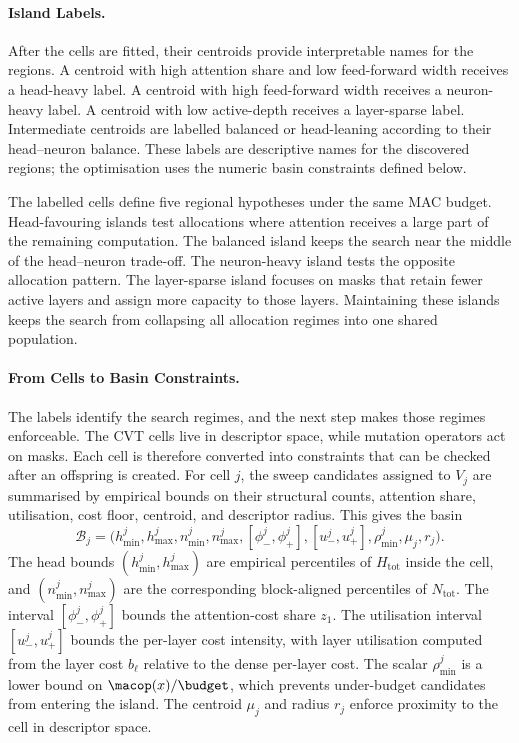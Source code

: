 \paragraph{Island Labels.}
After the cells are fitted, their centroids provide interpretable names for the regions. A centroid with high attention share and low feed-forward width receives a head-heavy label. A centroid with high feed-forward width receives a neuron-heavy label. A centroid with low active-depth receives a layer-sparse label. Intermediate centroids are labelled balanced or head-leaning according to their head--neuron balance. These labels are descriptive names for the discovered regions; the optimisation uses the numeric basin constraints defined below.

The labelled cells define five regional hypotheses under the same MAC budget. Head-favouring islands test allocations where attention receives a large part of the remaining computation. The balanced island keeps the search near the middle of the head--neuron trade-off. The neuron-heavy island tests the opposite allocation pattern. The layer-sparse island focuses on masks that retain fewer active layers and assign more capacity to those layers. Maintaining these islands keeps the search from collapsing all allocation regimes into one shared population.

\paragraph{From Cells to Basin Constraints.}
The labels identify the search regimes, and the next step makes those regimes enforceable. The CVT cells live in descriptor space, while mutation operators act on masks. Each cell is therefore converted into constraints that can be checked after an offspring is created. For cell $j$, the sweep candidates assigned to $V_j$ are summarised by empirical bounds on their structural counts, attention share, utilisation, cost floor, centroid, and descriptor radius. This gives the basin
\[
\mathcal{B}_j
=
\big(
h^j_{\min},h^j_{\max},
n^j_{\min},n^j_{\max},
[\phi^j_-,\phi^j_+],
[u^j_-,u^j_+],
\rho^j_{\min},
\mu_j,
r_j
\big).
\]
The head bounds $(h^j_{\min},h^j_{\max})$ are empirical percentiles of $H_{\mathrm{tot}}$ inside the cell, and $(n^j_{\min},n^j_{\max})$ are the corresponding block-aligned percentiles of $N_{\mathrm{tot}}$. The interval $[\phi^j_-,\phi^j_+]$ bounds the attention-cost share $z_1$. The utilisation interval $[u^j_-,u^j_+]$ bounds the per-layer cost intensity, with layer utilisation computed from the layer cost $b_\ell$ relative to the dense per-layer cost. The scalar $\rho^j_{\min}$ is a lower bound on $\macop(x)/\budget$, which prevents under-budget candidates from entering the island. The centroid $\mu_j$ and radius $r_j$ enforce proximity to the cell in descriptor space.

